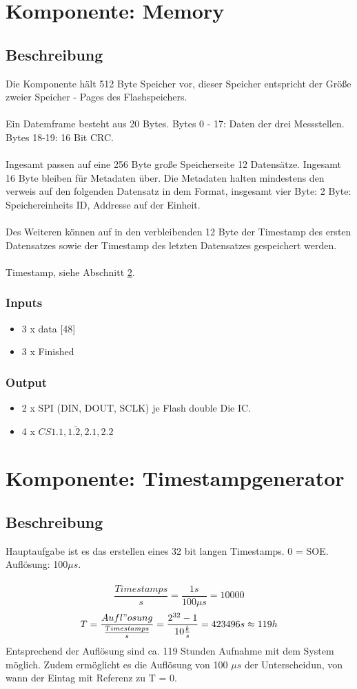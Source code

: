 \documentclass{scrreprt}
\begin{document}
\section{Komponente: Memory}
\subsection{Beschreibung}
Die Komponente hält 512 Byte Speicher vor, dieser Speicher entspricht der Größe zweier Speicher - Pages des Flashspeichers. \\\\
Ein Datemframe besteht aus 20 Bytes. Bytes 0 - 17: Daten der drei Messstellen. Bytes 18-19: 16 Bit CRC. \\\\
Ingesamt passen auf eine 256 Byte große Speicherseite 12 Datensätze. Ingesamt 16 Byte bleiben für Metadaten über. Die Metadaten halten mindestens den verweis auf den folgenden Datensatz in dem Format, insgesamt vier Byte: 2 Byte: Speichereinheits ID, Addresse auf der Einheit. \\\\
Des Weiteren können auf in den verbleibenden 12 Byte der Timestamp des ersten Datensatzes sowie der Timestamp des letzten Datensatzes gespeichert werden. \\\\
Timestamp, siehe Abschnitt \ref{timestamp}.
\subsubsection{Inputs}
\begin{itemize}
\item 3 x data [48] 
\item 3 x Finished 
\end{itemize}
\subsubsection{Output}
\begin{itemize}
\item 2 x SPI (DIN, DOUT, SCLK) je Flash double Die IC. 
\item 4 x $\overline{CS1.1, 1.2,  2.1, 2.2}$   
\end{itemize}
\section{Komponente: Timestampgenerator} 
\label{timestamp}
\subsection{Beschreibung}
Hauptaufgabe ist es das erstellen eines 32 bit langen Timestamps. 0 = SOE. Auflösung: 100$\mu s$. \\\\
$$\frac{Timestamps}{s} = \frac{1 s}{100 \mu s} = 10000$$
$$T = \frac{Aufl"osung}{\frac{Timestamps}{s}} = \frac{2^{32} - 1}{10\frac{k}{s}} = 423496s \approx 119h$$
Entsprechend der Auflösung sind ca. 119 Stunden Aufnahme mit dem System möglich. Zudem ermöglicht es die Auflösung von 100 $\mu s$ der Unterscheidun, von wann der Eintag mit Referenz zu T = 0.
\end{document}
